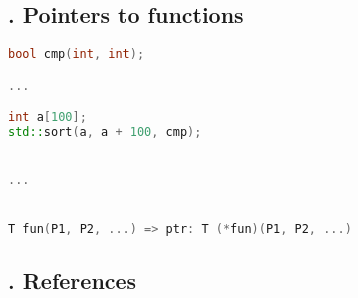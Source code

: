 \documentclass[12pt]{article}
\theoremstyle{definition}
\theoremstyle{definition}
\begin{document}
\subsection{. Pointers to functions}
\lstset{style=mystyle}
\begin{lstlisting}[language=C++, caption=Pointer to function]
bool cmp(int, int);

...

int a[100];
std::sort(a, a + 100, cmp);


...


T fun(P1, P2, ...) => ptr: T (*fun)(P1, P2, ...)
\end{lstlisting}

\subsection{. References}
\end{document}
